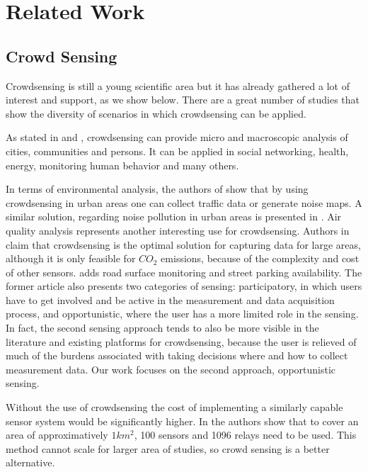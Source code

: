 \chapter{Related Work}
\label{chapter:related}


\section{Crowd Sensing}
\label{sec:related-crowd}
Crowdsensing is still a young scientific area but it has already gathered a lot of interest and support, as we show below. There are a great number of studies that show the diversity of scenarios in which crowdsensing can be applied.

As stated in \cite{lane2010survey} and \cite{khan2013mobile}, crowdsensing can provide micro and macroscopic analysis of cities, communities and persons. It can be applied in social networking, health, energy, monitoring human behavior and many others.

In terms of environmental analysis, the authors of \cite{guo2014participatory} show that by using crowdsensing in urban areas one can collect traffic data or generate noise maps. A similar solution, regarding noise pollution in urban areas is presented in \cite{stevens2010crowdsourcing}. Air quality analysis represents another interesting use for crowdsensing. Authors in \cite{zheng2013u} claim that crowdsensing is the optimal solution for capturing data for large areas, although it is only feasible for \(CO_2\) emissions, because of the complexity and cost of other sensors. \cite{ma2014opportunities} adds road surface monitoring and street parking availability. The former article also presents two categories of sensing: participatory, in which users have to get involved and be active in the measurement and data acquisition process, and opportunistic, where the user has a more limited role in the sensing. In fact, the second sensing approach tends to also be more visible in the literature and existing platforms for crowdsensing, because the user is relieved of much of the burdens associated with taking decisions where and how to collect measurement data. Our work focuses on the second approach, opportunistic sensing.

Without the use of crowdsensing the cost of implementing a similarly capable sensor system would be significantly higher. In \cite{mao2012citysee} the authors show that to cover an area of approximatively $1km^2$, 100 sensors and 1096 relays need to be used. This method cannot scale for larger area of studies, so crowd sensing is a better alternative.

